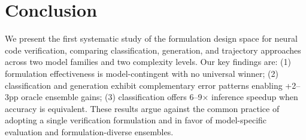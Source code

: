 \documentclass[11pt,a4paper]{article}
\begin{document}
\section{Conclusion}

We present the first systematic study of the formulation design space for neural code verification, comparing classification, generation, and trajectory approaches across two model families and two complexity levels. Our key findings are: (1) formulation effectiveness is model-contingent with no universal winner; (2) classification and generation exhibit complementary error patterns enabling +2--3pp oracle ensemble gains; (3) classification offers 6--9$\times$ inference speedup when accuracy is equivalent. These results argue against the common practice of adopting a single verification formulation and in favor of model-specific evaluation and formulation-diverse ensembles.



\end{document}

